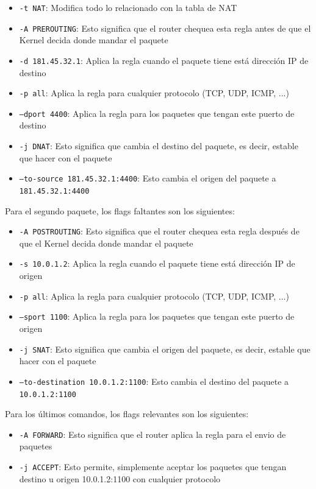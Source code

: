 \begin{itemize}
    \item \texttt{-t NAT}: Modifica todo lo relacionado con la tabla de NAT
    \item \texttt{-A PREROUTING}: Esto significa que el router chequea esta regla antes de que el Kernel decida donde mandar el paquete
    \item \texttt{-d 181.45.32.1}: Aplica la regla cuando el paquete tiene está dirección IP de destino
    \item \texttt{-p all}: Aplica la regla para cualquier protocolo (TCP, UDP, ICMP, ...)
    \item \texttt{--dport 4400}: Aplica la regla para los paquetes que tengan este puerto de destino
    \item \texttt{-j DNAT}: Esto significa que cambia el destino del paquete, es decir, estable que hacer con el paquete
    \item \texttt{--to-source 181.45.32.1:4400}: Esto cambia el origen del paquete a \texttt{181.45.32.1:4400}
\end{itemize}

\noindent Para el segundo paquete, los flags faltantes son los siguientes: 

\begin{itemize}
    \item \texttt{-A POSTROUTING}: Esto significa que el router chequea esta regla después de que el Kernel decida donde mandar el paquete
    \item \texttt{-s 10.0.1.2}: Aplica la regla cuando el paquete tiene está dirección IP de origen
    \item \texttt{-p all}: Aplica la regla para cualquier protocolo (TCP, UDP, ICMP, ...)
    \item \texttt{--sport 1100}: Aplica la regla para los paquetes que tengan este puerto de origen
    \item \texttt{-j SNAT}: Esto significa que cambia el origen del paquete, es decir, estable que hacer con el paquete
    \item \texttt{--to-destination 10.0.1.2:1100}: Esto cambia el destino del paquete a \texttt{10.0.1.2:1100}
\end{itemize}

\noindent Para los últimos comandos, los flags relevantes son los siguientes:

\begin{itemize}
    \item \texttt{-A FORWARD}: Esto significa que el router aplica la regla para el envio de paquetes
    \item \texttt{-j ACCEPT}: Esto permite, simplemente aceptar los paquetes que tengan destino u origen 10.0.1.2:1100 con cualquier protocolo
\end{itemize}

